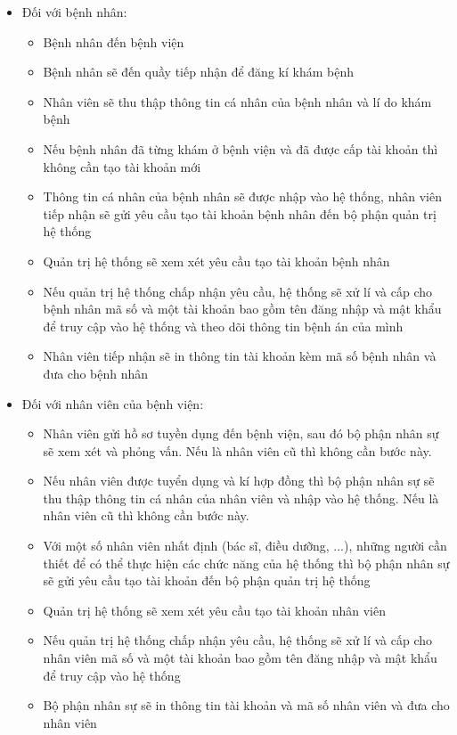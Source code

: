 \begin{itemize}
    \item Đối với bệnh nhân: 
        \begin{itemize}
            \item Bệnh nhân đến bệnh viện
            \item Bệnh nhân sẽ đến quầy tiếp nhận để đăng kí khám bệnh
            \item Nhân viên sẽ thu thập thông tin cá nhân của bệnh nhân và lí do khám bệnh
            \item Nếu bệnh nhân đã từng khám ở bệnh viện và đã được cấp tài khoản thì không cần tạo tài khoản mới
            \item Thông tin cá nhân của bệnh nhân sẽ được nhập vào hệ thống, nhân viên tiếp nhận sẽ gửi yêu cầu tạo tài khoản bệnh nhân đến bộ phận quản trị hệ thống
            \item Quản trị hệ thống sẽ xem xét yêu cầu tạo tài khoản bệnh nhân
            \item Nếu quản trị hệ thống chấp nhận yêu cầu, hệ thống sẽ xử lí và cấp cho bệnh nhân mã số và một tài khoản bao gồm tên đăng nhập và mật khẩu để truy cập vào hệ thống và theo dõi thông tin bệnh án của mình
            \item Nhân viên tiếp nhận sẽ in thông tin tài khoản kèm mã số bệnh nhân và đưa cho bệnh nhân
        \end{itemize} 
    \item Đối với nhân viên của bệnh viện:
        \begin{itemize}
            \item Nhân viên gửi hồ sơ tuyền dụng đến bệnh viện, sau đó bộ phận nhân sự sẽ xem xét và phỏng vấn. Nếu là nhân viên cũ thì không cần bước này.
            \item Nếu nhân viên được tuyển dụng và kí hợp đồng thì bộ phận nhân sự sẽ thu thập thông tin cá nhân của nhân viên và nhập vào hệ thống. Nếu là nhân viên cũ thì không cần bước này.
            \item Với một số nhân viên nhất định (bác sĩ, điều dưỡng, ...), những người cần thiết để có thể thực hiện các chức năng của hệ thống thì bộ phận nhân sự sẽ gửi yêu cầu tạo tài khoản đến bộ phận quản trị hệ thống
            \item Quản trị hệ thống sẽ xem xét yêu cầu tạo tài khoản nhân viên
            \item Nếu quản trị hệ thống chấp nhận yêu cầu, hệ thống sẽ xử lí và cấp cho nhân viên mã số và một tài khoản bao gồm tên đăng nhập và mật khẩu để truy cập vào hệ thống
            \item Bộ phận nhân sự sẽ in thông tin tài khoản và mã số nhân viên và đưa cho nhân viên
        \end{itemize}
\end{itemize}


